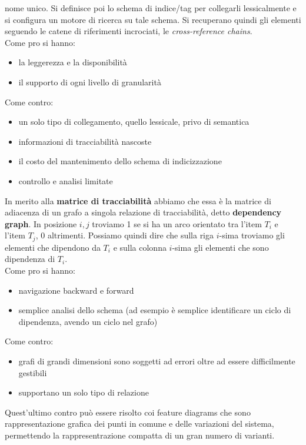 \documentclass[a4paper,12pt, oneside]{book}
\begin{document}
nome unico. Si definisce poi lo schema di indice/tag per collegarli
lessicalmente e si configura un motore di ricerca su tale schema. Si recuperano
quindi gli elementi seguendo le catene di riferimenti incrociati, le
\textit{cross-reference chains}.\\
Come pro si hanno:
\begin{itemize}
  \item la leggerezza e la disponibilità
  \item il supporto di ogni livello di granularità
\end{itemize}
Come contro:
\begin{itemize}
  \item un solo tipo di collegamento, quello lessicale, privo di semantica
  \item informazioni di tracciabilità nascoste
  \item il costo del mantenimento dello schema di indicizzazione
  \item controllo e analisi limitate
\end{itemize}
In merito alla \textbf{matrice di tracciabilità} abbiamo che essa è la matrice
di adiacenza di un grafo a singola relazione di tracciabilità, detto
\textbf{dependency graph}. In posizione $i,j$ troviamo 1 se si ha un arco
orientato tra l'item $T_i$ e l'item $T_j$, 0 altrimenti. Possiamo quindi dire
che sulla riga $i$-sima troviamo gli elementi che dipendono da $T_i$ e sulla
colonna $i$-sima gli elementi che sono dipendenza di $T_i$.\\
Come pro si hanno:
\begin{itemize}
  \item navigazione backward e forward
  \item semplice analisi dello schema (ad esempio è semplice identificare un
  ciclo di dipendenza, avendo un ciclo nel grafo)
\end{itemize}
Come contro:
\begin{itemize}
  \item grafi di grandi dimensioni sono soggetti ad errori oltre ad essere
  difficilmente gestibili
  \item supportano un solo tipo di relazione
\end{itemize}
Quest'ultimo contro può essere risolto coi feature diagrams che sono
rappresentazione grafica dei punti in comune e delle variazioni del sistema,
permettendo la rappresentrazione compatta di un gran numero di varianti. 
\end{document}
